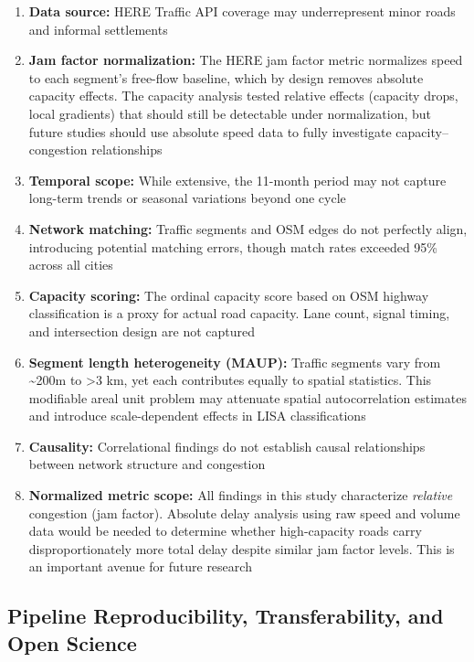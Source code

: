 \documentclass[12pt,a4paper]{article}
\begin{document}
\begin{enumerate}
\def\labelenumi{\arabic{enumi}.}

\item
  \textbf{Data source:} HERE Traffic API coverage may underrepresent minor roads and informal settlements
\item
  \textbf{Jam factor normalization:} The HERE jam factor metric normalizes speed to each segment's free-flow baseline, which by design removes absolute capacity effects. The capacity analysis tested relative effects (capacity drops, local gradients) that should still be detectable under normalization, but future studies should use absolute speed data to fully investigate capacity--congestion relationships
\item
  \textbf{Temporal scope:} While extensive, the 11-month period may not capture long-term trends or seasonal variations beyond one cycle
\item
  \textbf{Network matching:} Traffic segments and OSM edges do not perfectly align, introducing potential matching errors, though match rates exceeded 95\% across all cities
\item
  \textbf{Capacity scoring:} The ordinal capacity score based on OSM highway classification is a proxy for actual road capacity. Lane count, signal timing, and intersection design are not captured
\item
  \textbf{Segment length heterogeneity (MAUP):} Traffic segments vary from \textasciitilde200m to >3 km, yet each contributes equally to spatial statistics. This modifiable areal unit problem may attenuate spatial autocorrelation estimates and introduce scale-dependent effects in LISA classifications
\item
  \textbf{Causality:} Correlational findings do not establish causal relationships between network structure and congestion
\item
  \textbf{Normalized metric scope:} All findings in this study characterize \emph{relative} congestion (jam factor). Absolute delay analysis using raw speed and volume data would be needed to determine whether high-capacity roads carry disproportionately more total delay despite similar jam factor levels. This is an important avenue for future research
\end{enumerate}

\subsection{Pipeline Reproducibility, Transferability, and Open Science}
\end{document}
